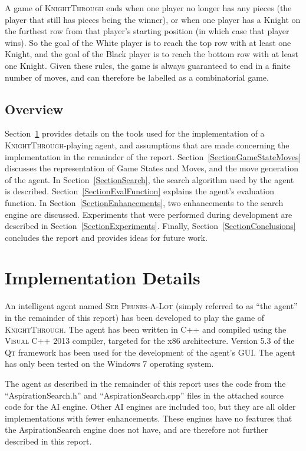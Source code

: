 \documentclass{article}
\newcommand{\refsection}[1]{Section~\ref{#1}}
\begin{document}
A game of \textsc{KnightThrough} ends when one player no longer has any pieces (the player that still has pieces being the winner), or when one player has a Knight on the furthest row from that player's starting position (in which case that player wins). So the goal of the White player is to reach the top row with at least one Knight, and the goal of the Black player is to reach the bottom row with at least one Knight. Given these rules, the game is always guaranteed to end in a finite number of moves, and can therefore be labelled as a combinatorial game.

\subsection{Overview}
\refsection{SectionImplementation} provides details on the tools used for the implementation of a \textsc{KnightThrough}-playing agent, and assumptions that are made concerning the implementation in the remainder of the report. \refsection{SectionGameStateMoves} discusses the representation of Game States and Moves, and the move generation of the agent. In \refsection{SectionSearch}, the search algorithm used by the agent is described. \refsection{SectionEvalFunction} explains the agent's evaluation function. In \refsection{SectionEnhancements}, two enhancements to the search engine are discussed. Experiments that were performed during development are described in \refsection{SectionExperiments}. Finally, \refsection{SectionConclusions} concludes the report and provides ideas for future work.

\section{Implementation Details} \label{SectionImplementation}
An intelligent agent named \textsc{Ser Prunes-A-Lot} (simply referred to as ``the agent'' in the remainder of this report) has been developed to play the game of \textsc{KnightThrough}. The agent has been written in \textsc{C++} and compiled using the \textsc{Visual C++ 2013} compiler, targeted for the x86 architecture. Version 5.3 of the \textsc{Qt} framework has been used for the development of the agent's GUI. The agent has only been tested on the Windows 7 operating system.

The agent as described in the remainder of this report uses the code from the ``AspirationSearch.h'' and ``AspirationSearch.cpp'' files in the attached source code for the AI engine. Other AI engines are included too, but they are all older implementations with fewer enhancements. These engines have no features that the AspirationSearch engine does not have, and are therefore not further described in this report.
\end{document}

